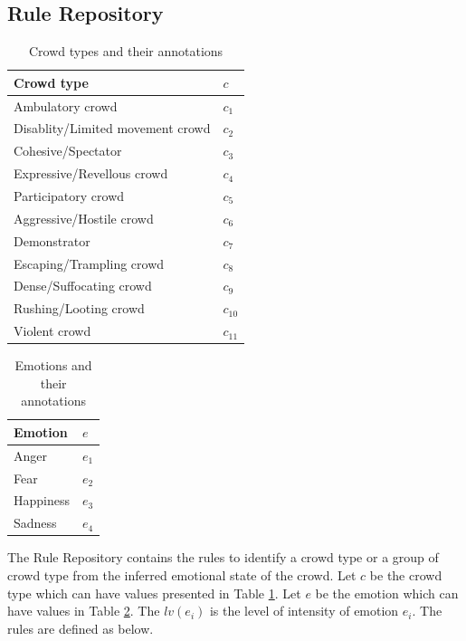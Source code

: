 \subsection{Rule Repository}
\begin{table}
\caption{Crowd types and their annotations}
\label{table:crowdTypeAnnotation}
\centering
\begin{tabular}{|l|l|}
\hline
\textbf{Crowd type} & \textbf{\(c\)} \\ \hline
Ambulatory crowd & \(c_1\) \\ \hline
Disablity/Limited movement crowd & \(c_2\) \\ \hline
Cohesive/Spectator & \(c_3\) \\ \hline
Expressive/Revellous crowd & \(c_4\) \\ \hline
Participatory crowd & \(c_5\) \\ \hline
Aggressive/Hostile crowd & \(c_6\) \\ \hline
Demonstrator & \(c_7\) \\ \hline
Escaping/Trampling crowd & \(c_8\) \\ \hline
Dense/Suffocating crowd & \(c_9\) \\ \hline
Rushing/Looting crowd & \(c_{10}\) \\ \hline
Violent crowd & \(c_{11}\) \\ \hline
\end{tabular}
\end{table}

\begin{table}
\caption{Emotions and their annotations}
\label{table:emotionAnnotation}
\centering
\begin{tabular}{|l|l|}
\hline
\textbf{Emotion} & \textbf{\(e\)} \\ \hline
Anger & \(e_1\) \\ \hline
Fear & \(e_2\) \\ \hline
Happiness & \(e_3\) \\ \hline
Sadness & \(e_4\) \\ \hline
\end{tabular}
\end{table}

The Rule Repository contains the rules to identify a crowd type or a group of crowd type from the inferred emotional state of the crowd. Let \(c\) be the crowd type which can have values presented in Table \ref{table:crowdTypeAnnotation}. Let \(e\) be the emotion which can have values in Table \ref{table:emotionAnnotation}. The \(lv(e_i)\) is the level of intensity of emotion \(e_i\). The rules are defined as below.

